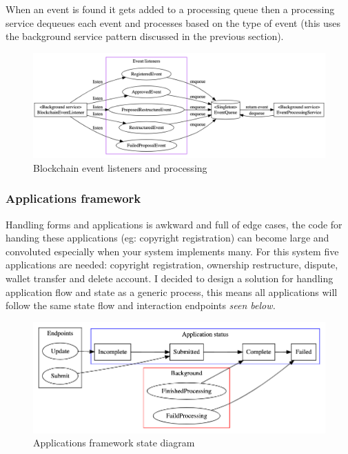 \documentclass[12pt]{article}
\begin{document}
When an event is found it gets added to a processing queue then a processing service dequeues each event and processes based on the type of event (this uses the background service pattern discussed in the previous section).

\begin{figure}[H]
\caption{Blockchain event listeners and processing}
\centering
\includegraphics[width=\textwidth,height=0.5\textheight,keepaspectratio]{images/operational/Event-Listening}
\end{figure}

\subsubsection{Applications framework}

Handling forms and applications is awkward and full of edge cases, the code for handing these applications (eg: copyright registration) can become large and convoluted especially when your system implements many. For this system five applications are needed: copyright registration, ownership restructure, dispute, wallet transfer and delete account. I decided to design a solution for handling application flow and state as a generic process, this means all applications will follow the same state flow and interaction endpoints \textit{seen below.} 

\begin{figure}[H]
\caption{Applications framework state diagram}
\centering
\includegraphics[width=\textwidth,height=0.5\textheight,keepaspectratio]{images/operational/applications-status}
\end{figure}
\end{document}
